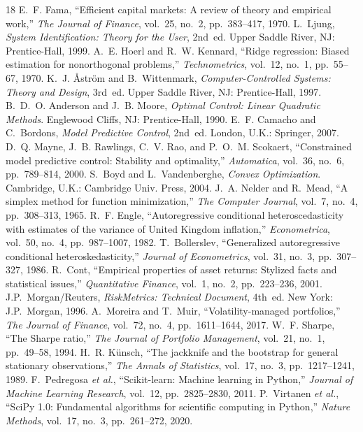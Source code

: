 \documentclass[conference]{IEEEtran}
\begin{document}
\begin{thebibliography}{18}
 E.~F. Fama, ``Efficient capital markets: A review of theory and empirical work,'' \emph{The Journal of Finance}, vol.~25, no.~2, pp.~383--417, 1970.
 L.~Ljung, \emph{System Identification: Theory for the User}, 2nd~ed. Upper Saddle River, NJ: Prentice-Hall, 1999.
 A.~E. Hoerl and R.~W. Kennard, ``Ridge regression: Biased estimation for nonorthogonal problems,'' \emph{Technometrics}, vol.~12, no.~1, pp.~55--67, 1970.
 K.~J. \r{A}str\"om and B.~Wittenmark, \emph{Computer-Controlled Systems: Theory and Design}, 3rd~ed. Upper Saddle River, NJ: Prentice-Hall, 1997.
 B.~D.~O. Anderson and J.~B. Moore, \emph{Optimal Control: Linear Quadratic Methods}. Englewood Cliffs, NJ: Prentice-Hall, 1990.
 E.~F. Camacho and C.~Bordons, \emph{Model Predictive Control}, 2nd~ed. London, U.K.: Springer, 2007.
 D.~Q. Mayne, J.~B. Rawlings, C.~V. Rao, and P.~O.~M. Scokaert, ``Constrained model predictive control: Stability and optimality,'' \emph{Automatica}, vol.~36, no.~6, pp.~789--814, 2000.
 S.~Boyd and L.~Vandenberghe, \emph{Convex Optimization}. Cambridge, U.K.: Cambridge Univ. Press, 2004.
 J.~A. Nelder and R.~Mead, ``A simplex method for function minimization,'' \emph{The Computer Journal}, vol.~7, no.~4, pp.~308--313, 1965.
 R.~F. Engle, ``Autoregressive conditional heteroscedasticity with estimates of the variance of United Kingdom inflation,'' \emph{Econometrica}, vol.~50, no.~4, pp.~987--1007, 1982.
 T.~Bollerslev, ``Generalized autoregressive conditional heteroskedasticity,'' \emph{Journal of Econometrics}, vol.~31, no.~3, pp.~307--327, 1986.
 R.~Cont, ``Empirical properties of asset returns: Stylized facts and statistical issues,'' \emph{Quantitative Finance}, vol.~1, no.~2, pp.~223--236, 2001.
 J.P.~Morgan/Reuters, \emph{RiskMetrics: Technical Document}, 4th~ed. New York: J.P.~Morgan, 1996.
 A.~Moreira and T.~Muir, ``Volatility-managed portfolios,'' \emph{The Journal of Finance}, vol.~72, no.~4, pp.~1611--1644, 2017.
 W.~F. Sharpe, ``The Sharpe ratio,'' \emph{The Journal of Portfolio Management}, vol.~21, no.~1, pp.~49--58, 1994.
 H.~R. K\"unsch, ``The jackknife and the bootstrap for general stationary observations,'' \emph{The Annals of Statistics}, vol.~17, no.~3, pp.~1217--1241, 1989.
 F.~Pedregosa \emph{et al.}, ``Scikit-learn: Machine learning in Python,'' \emph{Journal of Machine Learning Research}, vol.~12, pp.~2825--2830, 2011.
 P.~Virtanen \emph{et al.}, ``SciPy 1.0: Fundamental algorithms for scientific computing in Python,'' \emph{Nature Methods}, vol.~17, no.~3, pp.~261--272, 2020.
\end{thebibliography}
\end{document}
